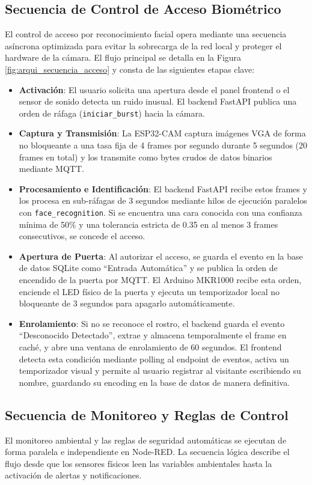 \documentclass[12pt,letterpaper]{article}
\begin{document}
\subsection{Secuencia de Control de Acceso Biométrico}
El control de acceso por reconocimiento facial opera mediante una secuencia asíncrona optimizada para evitar la sobrecarga de la red local y proteger el hardware de la cámara. El flujo principal se detalla en la Figura \ref{fig:arqui_secuencia_acceso} y consta de las siguientes etapas clave:
\begin{itemize}
    \item \textbf{Activación}: El usuario solicita una apertura desde el panel frontend o el sensor de sonido detecta un ruido inusual. El backend FastAPI publica una orden de ráfaga (\texttt{iniciar\_burst}) hacia la cámara.
    \item \textbf{Captura y Transmisión}: La ESP32-CAM captura imágenes VGA de forma no bloqueante a una tasa fija de 4 frames por segundo durante 5 segundos (20 frames en total) y los transmite como bytes crudos de datos binarios mediante MQTT.
    \item \textbf{Procesamiento e Identificación}: El backend FastAPI recibe estos frames y los procesa en sub-ráfagas de 3 segundos mediante hilos de ejecución paralelos con \texttt{face\_recognition}. Si se encuentra una cara conocida con una confianza mínima de 50\% y una tolerancia estricta de 0.35 en al menos 3 frames consecutivos, se concede el acceso.
    \item \textbf{Apertura de Puerta}: Al autorizar el acceso, se guarda el evento en la base de datos SQLite como ``Entrada Automática'' y se publica la orden de encendido de la puerta por MQTT. El Arduino MKR1000 recibe esta orden, enciende el LED físico de la puerta y ejecuta un temporizador local no bloqueante de 3 segundos para apagarlo automáticamente.
    \item \textbf{Enrolamiento}: Si no se reconoce el rostro, el backend guarda el evento ``Desconocido Detectado'', extrae y almacena temporalmente el frame en caché, y abre una ventana de enrolamiento de 60 segundos. El frontend detecta esta condición mediante polling al endpoint de eventos, activa un temporizador visual y permite al usuario registrar al visitante escribiendo su nombre, guardando su encoding en la base de datos de manera definitiva.
\end{itemize}

\subsection{Secuencia de Monitoreo y Reglas de Control}
El monitoreo ambiental y las reglas de seguridad automáticas se ejecutan de forma paralela e independiente en Node-RED. La secuencia lógica describe el flujo desde que los sensores físicos leen las variables ambientales hasta la activación de alertas y notificaciones.
\end{document}
